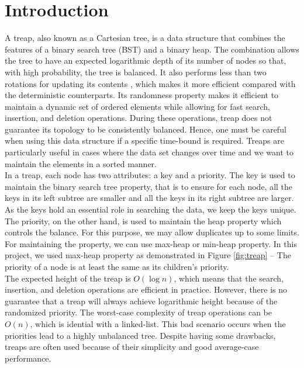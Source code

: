 \newpage
\section{Introduction}
\setcounter{subsection}{0}


\noindent A treap, also known as a Cartesian tree, is a data structure that combines the features of a binary search tree (BST) and a binary heap. The combination allows the tree to have an expected logarithmic depth of its number of nodes so that, with high probability, the tree is balanced. It also performs less than two rotations for updating its contents \cite{seidel1996randomized}, which makes it more efficient compared with the deterministic counterparts. Its randomness property makes it efficient to maintain a dynamic set of ordered elements while allowing for fast search, insertion, and deletion operations. During these operations, treap does not guarantee its topology to be consistently balanced. Hence, one must be careful when using this data structure if a specific time-bound is required. Treaps are particularly useful in cases where the data set changes over time and we want to maintain the elements in a sorted manner.\\

In a treap, each node has two attributes: a key and a priority. The key is used to maintain the binary search tree property, that is to ensure for each node, all the keys in its left subtree are smaller and all the keys in its right subtree are larger. As the keys hold an essential role in searching the data, we keep the keys unique. The priority, on the other hand, is used to maintain the heap property which controls the balance. For this purpose, we may allow duplicates up to some limits. For maintaining the property, we can use max-heap or min-heap property. In this project, we used max-heap property as demonstrated in Figure \ref*{fig:treap} -- The priority of a node is at least the same as its children's priority.\\

The expected height of the treap is $O(\log n)$, which means that the search, insertion, and deletion operations are efficient in practice. However, there is no guarantee that a treap will always achieve logarithmic height because of the randomized priority. The worst-case complexity of treap operations can be $O(n)$, which is idential with a linked-list. This bad scenario occurs when the priorities lead to a highly unbalanced tree. Despite having some drawbacks, treaps are often used because of their simplicity and good average-case performance.\\

